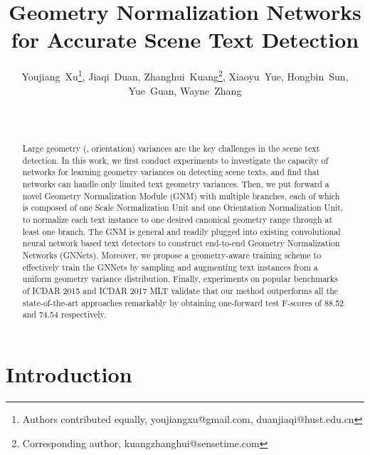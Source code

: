 \documentclass[10pt,twocolumn,letterpaper]{article}
\begin{document}
\title{Geometry Normalization Networks for Accurate Scene Text Detection}

\author{Youjiang~Xu\endnotemark[1]\thanks{Authors contributed equally, youjiangxu@gmail.com, duanjiaqi@hust.edu.cn}, Jiaqi~Duan\endnotemark[12]\footnotemark[1], Zhanghui~Kuang\endnotemark[1]\thanks{Corresponding author, kuangzhanghui@sensetime.com}, Xiaoyu~Yue\endnotemark[1], Hongbin~Sun\endnotemark[1], Yue~Guan\endnotemark[2], Wayne~Zhang\endnotemark[1]\\
 \\
 \\
}

\maketitle
\ificcvfinal\thispagestyle{empty}\fi


\begin{abstract}
Large geometry (\eg, orientation) variances are the key challenges in the scene text detection. In this work, we first conduct experiments to investigate the capacity of networks for learning geometry variances  on detecting scene texts, and find that networks can handle only limited text geometry variances. Then, we put forward a novel Geometry Normalization Module (GNM) with multiple branches, each of which is composed of one Scale Normalization Unit and one Orientation Normalization Unit, to normalize each text instance to one desired canonical geometry range through at least one branch.  The GNM is general and readily plugged into existing convolutional neural network based text detectors to construct end-to-end Geometry Normalization Networks (GNNets). Moreover, we propose a geometry-aware training scheme to effectively train the GNNets by sampling and augmenting text instances from a uniform geometry variance distribution. Finally, experiments on popular benchmarks of ICDAR 2015 and ICDAR 2017 MLT validate that our method  outperforms all the state-of-the-art approaches remarkably by obtaining one-forward test F-scores of 88.52 and 74.54 respectively.
\end{abstract}

\section{Introduction}
\end{document}
